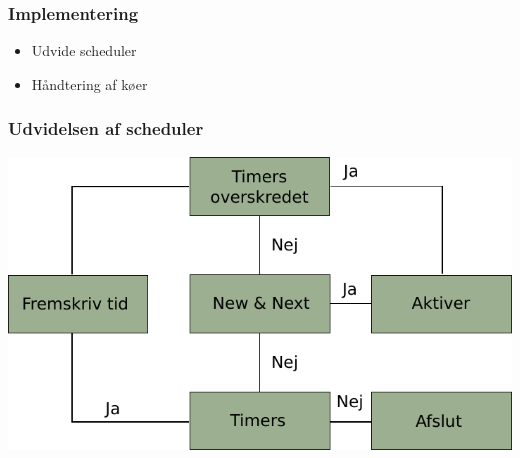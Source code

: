 \documentclass[12pt]{beamer}
\begin{document}
\begin{frame}
\frametitle{Implementering}
  \begin{itemize}   
	\item Udvide scheduler
	\item Håndtering af køer
  \end{itemize}
\end{frame}
 
\begin{frame}
\frametitle{Udvidelsen af scheduler}
\includegraphics[scale=0.9]{des-scheduler} 
\end{frame}


\end{document}
